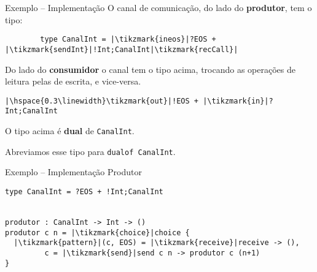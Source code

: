 \begin{frame}[fragile]{Exemplo -- Implementação}
  O canal de comunicação, do lado do \textbf{produtor}, tem o tipo:
  \vspace*{4mm}
  \begin{lstlisting}
        type CanalInt = |\tikzmark{ineos}|?EOS + |\tikzmark{sendInt}|!Int;CanalInt|\tikzmark{recCall}|
\end{lstlisting} 
 
 

 Do lado do \textbf{consumidor} o canal tem o tipo acima, trocando as operações de leitura pelas de escrita, e vice-versa.
\vspace*{4mm} 
\begin{lstlisting}
|\hspace{0.3\linewidth}\tikzmark{out}|!EOS + |\tikzmark{in}|?Int;CanalInt
\end{lstlisting}


\centering
\begin{tcolorbox}
  O tipo acima é \textbf{dual} de \lstinline|CanalInt|.

  Abreviamos esse tipo para \lstinline|dualof CanalInt|.
\end{tcolorbox}

\end{frame}

\begin{frame}[fragile]{Exemplo -- Implementação  \hfill \color{mLightBrown}Produtor}
  \begin{lstlisting}[xleftmargin=.15\textwidth, xrightmargin=.15\textwidth]
type CanalInt = ?EOS + !Int;CanalInt

    
produtor : CanalInt -> Int -> ()
produtor c n = |\tikzmark{choice}|choice {
  |\tikzmark{pattern}|(c, EOS) = |\tikzmark{receive}|receive -> (),
         c = |\tikzmark{send}|send c n -> produtor c (n+1)
}
  \end{lstlisting}


  
\end{frame}


